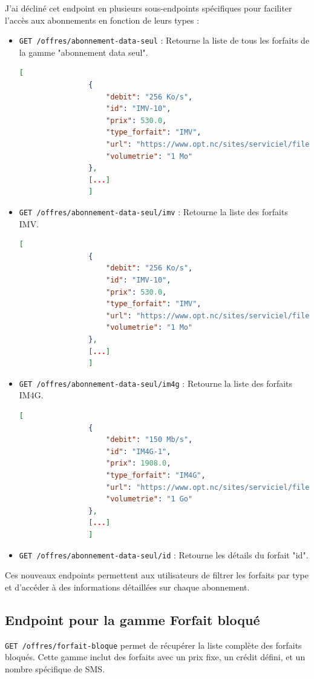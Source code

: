 \documentclass[11pt]{article}
\begin{document}
		J'ai décliné cet endpoint en plusieurs sous-endpoints spécifiques pour faciliter l'accès aux abonnements en fonction de leurs types :
	
		\begin{itemize}
			\item \texttt{GET /offres/abonnement-data-seul} : Retourne la liste de tous les forfaits de la gamme "abonnement data seul".
			\begin{lstlisting}[language=JSON]
				[
				{
					"debit": "256 Ko/s",
					"id": "IMV-10",
					"prix": 530.0,
					"type_forfait": "IMV",
					"url": "https://www.opt.nc/sites/serviciel/files/media/file/FI_Internet%20Mobile%20au%20Volume.pdf",
					"volumetrie": "1 Mo"
				},
				[...]
				]
			\end{lstlisting}
			
			\item \texttt{GET /offres/abonnement-data-seul/imv} : Retourne la liste des forfaits IMV.
			\begin{lstlisting}[language=JSON]
				[
				{
					"debit": "256 Ko/s",
					"id": "IMV-10",
					"prix": 530.0,
					"type_forfait": "IMV",
					"url": "https://www.opt.nc/sites/serviciel/files/media/file/FI_Internet%20Mobile%20au%20Volume.pdf",
					"volumetrie": "1 Mo"
				},
				[...]
				]
			\end{lstlisting}
			
			\item \texttt{GET /offres/abonnement-data-seul/im4g} : Retourne la liste des forfaits IM4G.
			\begin{lstlisting}[language=JSON]
				[
				{
					"debit": "150 Mb/s",
					"id": "IM4G-1",
					"prix": 1908.0,
					"type_forfait": "IM4G",
					"url": "https://www.opt.nc/sites/serviciel/files/media/file/FI_ForfaitInternetMobile4G%202022_1.pdf",
					"volumetrie": "1 Go"
				},
				[...]
				]
			\end{lstlisting}
			
			\item \texttt{GET /offres/abonnement-data-seul/{id}} : Retourne les détails du forfait "{id}".
		\end{itemize}
		Ces nouveaux endpoints permettent aux utilisateurs de filtrer les forfaits par type et d'accéder à des informations détaillées sur chaque abonnement.
		
		\subsection*{Endpoint pour la gamme Forfait bloqué}
		\texttt{GET /offres/forfait-bloque} permet de récupérer la liste complète des forfaits bloqués. Cette gamme inclut des forfaits avec un prix fixe, un crédit défini, et un nombre spécifique de SMS.
		
\end{document}
